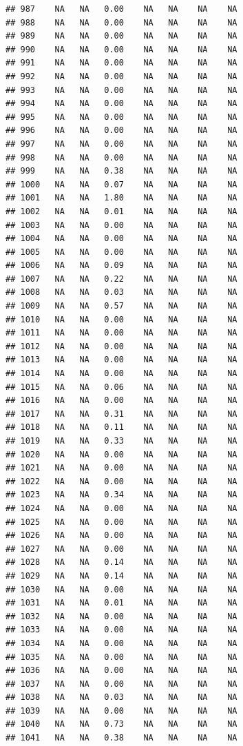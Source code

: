 \documentclass{article}\usepackage{graphicx, color}
\makeatletter
\newenvironment{kframe}{%
 \def\at@end@of@kframe{}%
 \ifinner\ifhmode%
  \def\at@end@of@kframe{\end{minipage}}%
  \begin{minipage}{\columnwidth}%
 \fi\fi%
 \def\FrameCommand##1{\hskip\@totalleftmargin \hskip-\fboxsep
 \colorbox{shadecolor}{##1}\hskip-\fboxsep
     \hskip-\linewidth \hskip-\@totalleftmargin \hskip\columnwidth}%
 \MakeFramed {\advance\hsize-\width
   \@totalleftmargin\z@ \linewidth\hsize
   \@setminipage}}%
 {\par\unskip\endMakeFramed%
 \at@end@of@kframe}
\newenvironment{knitrout}{}{} %
\makeatother
\begin{document}
\begin{knitrout}
\begin{kframe}
\begin{verbatim}
## 987    NA   NA   0.00    NA   NA    NA    NA
## 988    NA   NA   0.00    NA   NA    NA    NA
## 989    NA   NA   0.00    NA   NA    NA    NA
## 990    NA   NA   0.00    NA   NA    NA    NA
## 991    NA   NA   0.00    NA   NA    NA    NA
## 992    NA   NA   0.00    NA   NA    NA    NA
## 993    NA   NA   0.00    NA   NA    NA    NA
## 994    NA   NA   0.00    NA   NA    NA    NA
## 995    NA   NA   0.00    NA   NA    NA    NA
## 996    NA   NA   0.00    NA   NA    NA    NA
## 997    NA   NA   0.00    NA   NA    NA    NA
## 998    NA   NA   0.00    NA   NA    NA    NA
## 999    NA   NA   0.38    NA   NA    NA    NA
## 1000   NA   NA   0.07    NA   NA    NA    NA
## 1001   NA   NA   1.80    NA   NA    NA    NA
## 1002   NA   NA   0.01    NA   NA    NA    NA
## 1003   NA   NA   0.00    NA   NA    NA    NA
## 1004   NA   NA   0.00    NA   NA    NA    NA
## 1005   NA   NA   0.00    NA   NA    NA    NA
## 1006   NA   NA   0.09    NA   NA    NA    NA
## 1007   NA   NA   0.22    NA   NA    NA    NA
## 1008   NA   NA   0.03    NA   NA    NA    NA
## 1009   NA   NA   0.57    NA   NA    NA    NA
## 1010   NA   NA   0.00    NA   NA    NA    NA
## 1011   NA   NA   0.00    NA   NA    NA    NA
## 1012   NA   NA   0.00    NA   NA    NA    NA
## 1013   NA   NA   0.00    NA   NA    NA    NA
## 1014   NA   NA   0.00    NA   NA    NA    NA
## 1015   NA   NA   0.06    NA   NA    NA    NA
## 1016   NA   NA   0.00    NA   NA    NA    NA
## 1017   NA   NA   0.31    NA   NA    NA    NA
## 1018   NA   NA   0.11    NA   NA    NA    NA
## 1019   NA   NA   0.33    NA   NA    NA    NA
## 1020   NA   NA   0.00    NA   NA    NA    NA
## 1021   NA   NA   0.00    NA   NA    NA    NA
## 1022   NA   NA   0.00    NA   NA    NA    NA
## 1023   NA   NA   0.34    NA   NA    NA    NA
## 1024   NA   NA   0.00    NA   NA    NA    NA
## 1025   NA   NA   0.00    NA   NA    NA    NA
## 1026   NA   NA   0.00    NA   NA    NA    NA
## 1027   NA   NA   0.00    NA   NA    NA    NA
## 1028   NA   NA   0.14    NA   NA    NA    NA
## 1029   NA   NA   0.14    NA   NA    NA    NA
## 1030   NA   NA   0.00    NA   NA    NA    NA
## 1031   NA   NA   0.01    NA   NA    NA    NA
## 1032   NA   NA   0.00    NA   NA    NA    NA
## 1033   NA   NA   0.00    NA   NA    NA    NA
## 1034   NA   NA   0.00    NA   NA    NA    NA
## 1035   NA   NA   0.00    NA   NA    NA    NA
## 1036   NA   NA   0.00    NA   NA    NA    NA
## 1037   NA   NA   0.00    NA   NA    NA    NA
## 1038   NA   NA   0.03    NA   NA    NA    NA
## 1039   NA   NA   0.00    NA   NA    NA    NA
## 1040   NA   NA   0.73    NA   NA    NA    NA
## 1041   NA   NA   0.38    NA   NA    NA    NA

\end{verbatim}
\end{kframe}
\end{knitrout}
\end{document}
